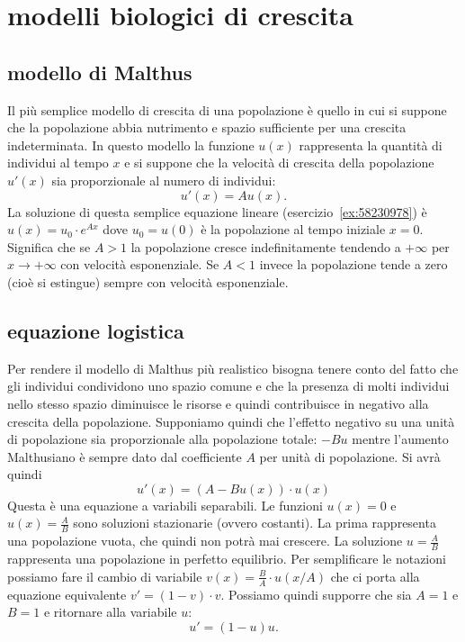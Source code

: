 \section{modelli biologici di crescita}
%

\subsection{modello di Malthus}
%
%
%

Il più semplice modello di crescita di una popolazione è quello 
in cui si suppone che la popolazione abbia nutrimento e spazio sufficiente 
per una crescita indeterminata.
In questo modello la funzione $u(x)$ rappresenta la quantità di individui 
al tempo $x$ e si suppone che la velocità di crescita della popolazione $u'(x)$ 
sia proporzionale al numero di individui:
\[
  u'(x) = A u(x).  
\]
La soluzione di questa semplice equazione lineare (esercizio~\eqref{ex:58230978})
è $u(x) = u_0\cdot  e^{A x}$ dove $u_0=u(0)$ è la popolazione al tempo 
iniziale $x=0$.
Significa che se $A>1$ la popolazione cresce indefinitamente tendendo 
a $+\infty$ per $x\to +\infty$ con velocità esponenziale.
Se $A<1$ invece la popolazione tende a zero (cioè si estingue)
sempre con velocità esponenziale.

\subsection{equazione logistica}
%
%
%

Per rendere il modello di Malthus più realistico bisogna tenere conto 
del fatto che gli individui condividono uno spazio comune e che 
la presenza di molti individui nello stesso spazio diminuisce le risorse 
e quindi contribuisce in negativo alla crescita della popolazione. 
Supponiamo quindi che l'effetto negativo su una unità di popolazione 
sia proporzionale alla popolazione totale: $-Bu$ mentre l'aumento 
Malthusiano è sempre dato dal coefficiente $A$ per unità di popolazione. 
Si avrà quindi 
\[
  u'(x)  = (A-Bu(x))\cdot u(x)
\]
Questa è una equazione a variabili separabili. 
Le funzioni $u(x) = 0$ e $u(x) = \frac{A}{B}$ sono soluzioni 
stazionarie (ovvero costanti). 
La prima rappresenta una popolazione vuota, che quindi non potrà 
mai crescere. 
La soluzione $u=\frac{A}{B}$ rappresenta una popolazione 
in perfetto equilibrio.
Per semplificare le notazioni possiamo fare il cambio di variabile 
$v(x) = \frac{B}{A}\cdot u(x/A)$ che ci porta alla equazione 
equivalente $v'=(1-v)\cdot v$. 
Possiamo quindi supporre che sia $A=1$ e $B=1$ e ritornare 
alla variabile $u$:
\begin{equation}\label{eq:ode_logistica}
  u' = (1-u) u.  
\end{equation}

